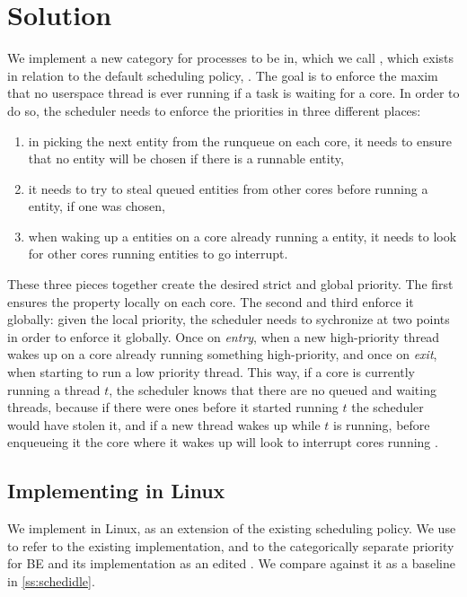 \section{Solution}\label{s:maybe-solution}

We implement a new category for processes to be in, which we call \schedbe{},
which exists in relation to the default scheduling policy, \schednormal{}. The
goal is to enforce the maxim that no \schedbe{} userspace thread is ever running
if a \schednormal{} task is waiting for a core. In order to do so, the scheduler
needs to enforce the priorities in three different places:
\begin{enumerate}
    \item in picking the next entity from the runqueue on each core, it needs to
ensure that no \schedbe{} entity will be chosen if there is a runnable
\schednormal{} entity,
    \item it needs to try to steal queued \schednormal{} entities from other cores
before running a \schedbe{} entity, if one was chosen,
    \item when waking up a \schednormal{} entities on a core already running a
    \schednormal{} entity, it needs to look for other cores running \schedbe{}
    entities to go interrupt.
\end{enumerate}

These three pieces together create the desired strict and global priority. The
first ensures the property locally on each core. The second and third enforce it
globally: given the local priority, the scheduler needs to sychronize at two
points in order to enforce it globally. Once on \textit{entry}, when a new
high-priority thread wakes up on a core already running something high-priority,
and once on \textit{exit}, when starting to run a low priority thread. This way,
if a core is currently running a \schedbe{} thread $t$, the scheduler knows that
there are no queued and waiting \schednormal{} threads, because if there were
ones before it started running $t$ the scheduler would have stolen it, and if a
new \schednormal{} thread wakes up while $t$ is running, before enqueueing it
the core where it wakes up will look to interrupt cores running \schedbe{}.


\subsection{Implementing \schedbe{} in Linux}

We implement \schedbe{} in Linux, as an extension of the existing \schedidle{}
scheduling policy. We use \schedidle{} to refer to the existing implementation,
and \schedbe{} to the categorically separate priority for BE and its
implementation as an edited \schedidle{}. We compare against it as a baseline in
\autoref{ss:schedidle}. 

